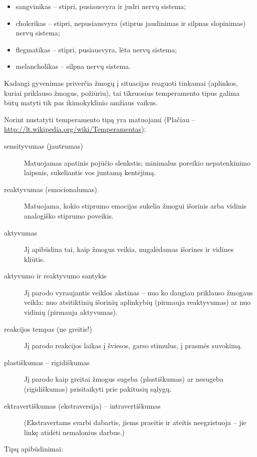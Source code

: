 \begin{itemize}
  \item sangvinikas – stipri, pusiausvyra ir judri nervų sistema;
  \item cholerikas – stipri, nepusiausvyra (stiprus jaudinimas ir 
    silpnas slopinimas) nervų sistema;
  \item flegmatikas – stipri, pusiausvyra, lėta nervų sistema;
  \item melancholikas – silpna nervų sistema.
\end{itemize}

Kadangi gyvenimas priverčia žmogų į situacijas reaguoti tinkamai 
(aplinkos, kuriai priklauso žmogus, požiūriu), tai tikruosius temperamento
tipus galima būtų matyti tik pas ikimokyklinio amžiaus vaikus.

Norint nustatyti temperamento tipą yra matuojami (Plačiau –
\url{http://lt.wikipedia.org/wiki/Temperamentas}):

\begin{description}
  \item[sensityvumas (jautrumas)] Matuojamas apatinis pojūčio slenkstis;
    minimalus poreikio nepatenkinimo laipsnis, sukeliantis vos juntamą
    kentėjimą.
  \item[reaktyvumas (emocionalumas)] Matuojama, kokio stiprumo emocijas
    sukelia žmogui išorinis arba vidinis analogiško stiprumo poveikis.
  \item[aktyvumas] Jį apibūdina tai, kaip žmogus veikia, nugalėdamas 
    išorines ir vidines kliūtis.
  \item[aktyvumo ir reaktyvumo santykis] Jį parodo vyraujantis veiklos
    akstinas – nuo ko daugiau priklauso žmogaus veikla: nuo atsitiktinių
    išorinių aplinkybių (pirmauja reaktyvumas) ar nuo vidinių (pirmauja
    aktyvumas).
  \item[reakcijos tempas (ne greitis!)] Jį parodo reakcijos laikas į 
    šviesos, garso stimulus, į prasmės suvokimą.
  \item[plastiškumas – rigidiškumas] Jį parodo kaip greitai žmogus sugeba
    (plastiškumas) ar nesugeba (rigidiškumas) prisitaikyti prie pakitusių 
    sąlygų.
  \item[ektravertiškumas (\gls{ekstraversija}) – intravertiškumas] 
    (Ekstravertams svarbi dabartis, jiems praeitis ir ateitis neegzistuoja 
    – jie linkę atidėti nemalonius darbus.)
\end{description}

Tipų apibūdinimai:

